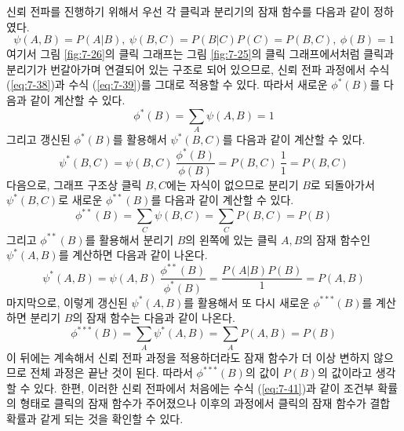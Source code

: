 \documentclass[a4paper]{oblivoir}
\begin{document}
신뢰 전파를 진행하기 위해서 우선 각 클릭과 분리기의 잠재 함수를 다음과 같이 정하였다.
\begin{equation}
\psi(A,B) = P(A|B), \ \psi(B,C) = P(B|C)P(C) = P(B,C), \ \phi(B) = 1
\label{eq:7-41}
\end{equation} 
여기서 그림 \ref{fig:7-26}의 클릭 그래프는 그림 \ref{fig:7-25}의 클릭 그래프에서처럼 클릭과 분리기가 번갈아가며 연결되어 있는 구조로 되어 있으므로, 신뢰 전파 과정에서 수식 (\ref{eq:7-38})과 수식 (\ref{eq:7-39})를 그대로 적용할 수 있다. 따라서 새로운 $\phi^{*}(B)$를 다음과 같이 계산할 수 있다. 
\begin{equation}
\phi^{*}(B) = \sum_{A} \psi(A,B) = 1
\label{eq:7-42}
\end{equation} 
그리고 갱신된 $\phi^{*}(B)$를 활용해서 $\psi^{*}(B,C)$를 다음과 같이 계산할 수 있다. 
\begin{equation}
\psi^{*}(B,C) = \psi(B,C) \ \frac{\phi^{*}(B)}{\phi(B)} = P(B,C) \ \frac{1}{1} = P(B,C)
\label{eq:7-43}
\end{equation} 
다음으로, 그래프 구조상 클릭 $B,C$에는 자식이 없으므로 분리기 $B$로 되돌아가서 $\psi^{*}(B,C)$로 새로운 $\phi^{**}(B)$를 다음과 같이 계산할 수 있다. 
\begin{equation}
\phi^{**}(B) = \sum_{C} \psi(B,C) = \sum_{C} P(B,C) = P(B)
\label{eq:7-44}
\end{equation} 
그리고 $\phi^{**}(B)$를 활용해서 분리기 $B$의 왼쪽에 있는 클릭 $A,B$의 잠재 함수인 $\psi^{*}(A,B)$를 계산하면 다음과 같이 나온다. 
\begin{equation}
\psi^{*}(A,B) = \psi(A,B) \ \frac{\phi^{**}(B)}{\phi^{*}(B)} = \frac{P(A|B)P(B)}{1} = P(A,B)
\label{eq:7-45}
\end{equation} 
마지막으로, 이렇게 갱신된 $\psi^{*}(A,B)$를 활용해서 또 다시 새로운 $\phi^{***}(B)$를 계산하면 분리기 $B$의 잠재 함수는 다음과 같이 나온다. 
\begin{equation}
\phi^{***}(B) = \sum_{A} \psi^{*}(A,B) = \sum_{A} P(A,B) = P(B)
\label{eq:7-46}
\end{equation} 
이 뒤에는 계속해서 신뢰 전파 과정을 적용하더라도 잠재 함수가 더 이상 변하지 않으므로 전체 과정은 끝난 것이 된다. 따라서 $\phi^{***}(B)$의 값이 $P(B)$의 값이라고 생각할 수 있다. 한편, 이러한 신뢰 전파에서 처음에는 수식 (\ref{eq:7-41})과 같이 조건부 확률의 형태로 클릭의 잠재 함수가 주어졌으나 이후의 과정에서 클릭의 잠재 함수가 결합 확률과 같게 되는 것을 확인할 수 있다. \\
\end{document}
